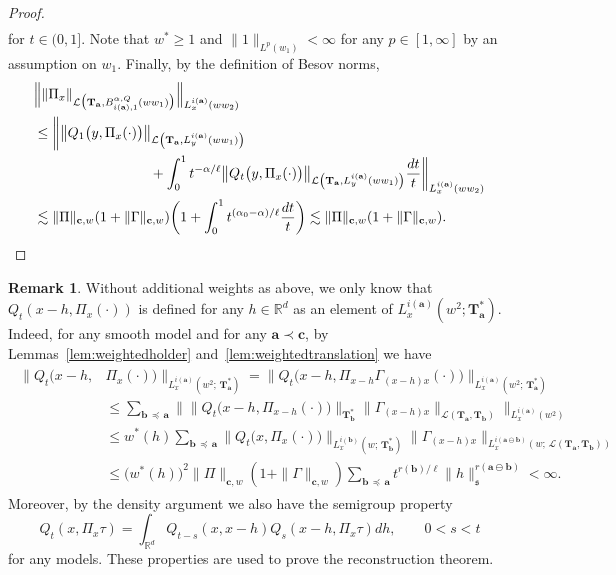 \documentclass[10pt]{amsart}
\theoremstyle{definition}
\newtheorem{rema}[theo]{Remark}
\numberwithin{equation}{section}
\newcommand{\bbR}{\mathbb{R}}
\newcommand{\mfs}{\mathfrak{s}}
\newcommand{\wco}{w^*}
\newcommand{\bfa}{\mathbf{a}}
\newcommand{\bfb}{\mathbf{b}}
\newcommand{\bfc}{\mathbf{c}}
\newcommand{\bfaob}{\mathbf{a}\ominus\mathbf{b}}
\newcommand{\bfT}{\mathbf{T}}
\newcommand{\mcL}{\mathcal{L}}
\begin{document}
\begin{proof}
\begin{multline*}
\end{multline*}
\endgroup
for $t\in(0,1]$. Note that $w^*\ge1$ and $\|1\|_{L^p(w_1)}<\infty$ for any $p\in[1,\infty]$ by an assumption on $w_1$. Finally, by the definition of Besov norms,
\begin{align*}
&\Big\|\|\Pi_x\|_{\mcL\big(\bfT_\bfa,B_{i(\bfa),1}^{\alpha,Q}(ww_1)\big)}\Big\|_{L_x^{i(\bfa)}(ww_2)}\\
&\le\bigg\|
\big\|Q_1\big(y,\Pi_x(\cdot)\big)\big\|_{\mcL\left(\bfT_\bfa,L_y^{i(\bfa)}(ww_1)\right)}\\
&\mkern150mu+\int_0^1t^{-\alpha/\ell}\big\|Q_t\big(y,\Pi_x(\cdot)\big)\big\|_{\mcL\left(\bfT_\bfa,L_y^{i(\bfa)}(ww_1)\right)}\frac{dt}t
\bigg\|_{L_x^{i(\bfa)}(ww_2)}\\
&\lesssim\|\Pi\|_{\bfc,w}(1+\|\Gamma\|_{\bfc,w})\bigg(1+\int_0^1t^{(\alpha_0-\alpha)/\ell}\frac{dt}t\bigg)
\lesssim\|\Pi\|_{\bfc,w}(1+\|\Gamma\|_{\bfc,w}).\qedhere
\end{align*}
\end{proof}

\begin{rema}\label{rem:whatisknownforZ}
Without additional weights as above, we only know that $Q_t(x-h,\Pi_x(\cdot))$ is defined for any $h\in\bbR^d$ as an element of $L_x^{i(\bfa)}(w^2;\bfT_\bfa^*)$. Indeed, for any smooth model and for any $\bfa\prec\bfc$, by Lemmas~\ref{lem:weightedholder} and~\ref{lem:weightedtranslation} we have
\begin{align}\label{eq:Q(x-h,Pix)}
\begin{aligned}
\big\|Q_t\big(x-h,&\Pi_x(\cdot)\big)\big\|_{L_x^{i(\bfa)}\left(w^2;\,\bfT_\bfa^*\right)} =\big\|Q_t\big(x-h,\Pi_{x-h}\Gamma_{(x-h)x}(\cdot)\big)\big\|_{L_x^{i(\bfa)}\left(w^2;\,\bfT_\bfa^*\right)}\\
&\le\sum_{\bfb\,\preceq\,\bfa}\Big\|\big\|Q_t\big(x-h,\Pi_{x-h}(\cdot)\big)\big\|_{\bfT_\bfb^*}\|\Gamma_{(x-h)x}\|_{\mcL(\bfT_\bfa,\bfT_\bfb)}\Big\|_{L_x^{i(\bfa)}(w^2)}\\
&\le \wco(h)\sum_{\bfb\,\preceq\,\bfa}\big\|Q_t\big(x,\Pi_x(\cdot)\big)\big\|_{L_x^{i(\bfb)}\left(w;\,\bfT_\bfb^*\right)}\|\Gamma_{(x-h)x}\|_{L_x^{i(\bfaob)}(w;\,\mcL(\bfT_\bfa,\bfT_\bfb))}\\
&\le \big(\wco(h)\big)^2\|\Pi\|_{\bfc,w}(1+\|\Gamma\|_{\bfc,w})\sum_{\bfb\,\preceq\,\bfa}t^{r(\bfb)/\ell}\|h\|_\mfs^{r(\bfaob)}<\infty.
\end{aligned}
\end{align}
Moreover, by the density argument we also have the semigroup property
\[
Q_t(x,\Pi_x\tau)=\int_{\bbR^d}Q_{t-s}(x,x-h)Q_s(x-h,\Pi_x\tau)dh,\qquad 0<s<t
\]
for any models. These properties are used to prove the reconstruction theorem.
\end{rema}
\end{document}
